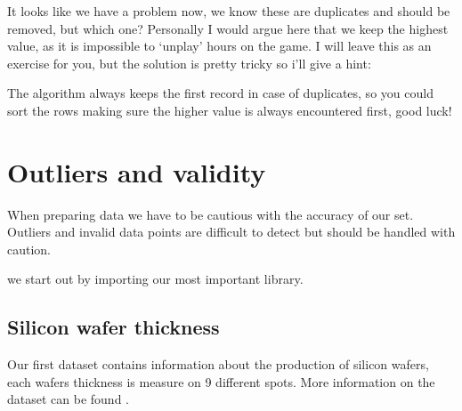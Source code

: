 \documentclass[letterpaper,10pt,english]{jupyterBook}
\begin{document}
\sphinxAtStartPar
It looks like we have a problem now, we know these are duplicates and should be removed, but which one?
Personally I would argue here that we keep the highest value, as it is impossible to ‘unplay’ hours on the game.
I will leave this as an exercise for you, but the solution is pretty tricky so i’ll give a hint:

\sphinxAtStartPar
The algorithm always keeps the first record in case of duplicates, so you could sort the rows making sure the higher value is always encountered first, good luck!


\chapter{Outliers and validity}
\label{\detokenize{c2_data_preparation/outliers:outliers-and-validity}}\label{\detokenize{c2_data_preparation/outliers::doc}}
\sphinxAtStartPar
When preparing data we have to be cautious with the accuracy of our set.
Outliers and invalid data points are difficult to detect but should be handled with caution.

\sphinxAtStartPar
we start out by importing our most important library.

\begin{sphinxVerbatim}[commandchars=\\\{\}]
   
\end{sphinxVerbatim}


\section{Silicon wafer thickness}
\label{\detokenize{c2_data_preparation/outliers:silicon-wafer-thickness}}
\sphinxAtStartPar
Our first dataset contains information about the production of silicon wafers, each wafers thickness is measure on 9 different spots.
More information on the dataset can be found .

\begin{sphinxVerbatim}[commandchars=\\\{\}]
  
\end{sphinxVerbatim}
\end{document}
